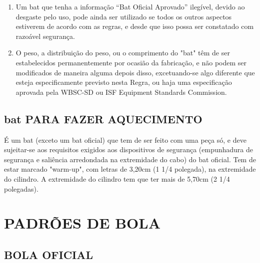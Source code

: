 \begin{multicols}{2}
\begin{enumerate}[label= \arabic*)]
		\item  Um \gls{bat} que tenha a informa\c{c}\~ao “Bat Oficial Aprovado” ilegível, devido ao desgaste pelo uso, pode ainda ser utilizado se todos os outros aspectos estiverem de acordo com as regras, e desde que isso possa ser constatado com razo\'avel seguran\c{c}a. 
		\item  O peso, a distribui\c{c}\~ao do peso, ou o comprimento do "bat" t\^em de ser estabelecidos permanentemente por ocasi\~ao da fabrica\c{c}\~ao, e n\~ao podem ser modificados de maneira alguma depois disso, excetuando-se algo diferente que esteja especificamente previsto nesta Regra, ou haja uma especifica\c{c}\~ao aprovada pela WBSC-SD ou ISF Equipment Standards Commission. 
	\end{enumerate}
\end{multicols}

\section{\gls{bat} PARA FAZER AQUECIMENTO} 
\begin{multicols}{2}
	É um \gls{bat} (exceto um \gls{bat} oficial) que tem de ser feito com uma pe\c{c}a s\'o, e deve sujeitar-se aos requisitos exigidos aos dispositivos de seguran\c{c}a (empunhadura de seguran\c{c}a e sali\^encia arredondada na extremidade do cabo) do \gls{bat} oficial. Tem de estar marcado "warm-up", com letras de 3,20cm (1 1/4 polegada), na extremidade do 
	cilindro. A extremidade do cilindro tem que ter mais de 5,70cm (2 1/4 polegadas). 
	
\end{multicols}


\chapter{PADRÕES DE BOLA}
\label{ap:Bola}

\section{BOLA OFICIAL}


